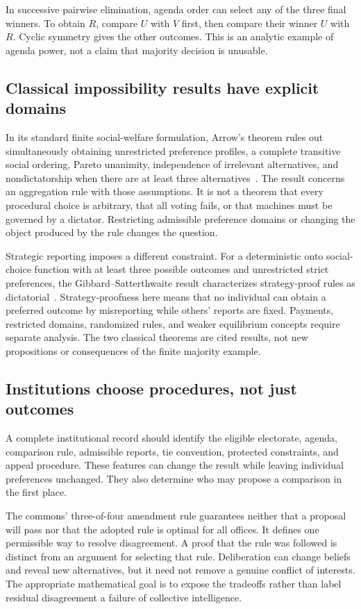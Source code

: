 \documentclass[11pt,letterpaper]{article}
\theoremstyle{plain}
\theoremstyle{definition}
\theoremstyle{remark}
\begin{document}
In successive pairwise elimination, agenda order can select any of the three final winners. To obtain $R$, compare $U$ with $V$ first, then compare their winner $U$ with $R$. Cyclic symmetry gives the other outcomes. This is an analytic example of agenda power, not a claim that majority decision is unusable.

\subsection{Classical impossibility results have explicit domains}
In its standard finite social-welfare formulation, Arrow's theorem rules out simultaneously obtaining unrestricted preference profiles, a complete transitive social ordering, Pareto unanimity, independence of irrelevant alternatives, and nondictatorship when there are at least three alternatives~\cite{arrow}. The result concerns an aggregation rule with those assumptions. It is not a theorem that every procedural choice is arbitrary, that all voting fails, or that machines must be governed by a dictator. Restricting admissible preference domains or changing the object produced by the rule changes the question.

Strategic reporting imposes a different constraint. For a deterministic onto social-choice function with at least three possible outcomes and unrestricted strict preferences, the Gibbard--Satterthwaite result characterizes strategy-proof rules as dictatorial~\cite{gibbard,satterthwaite}. Strategy-proofness here means that no individual can obtain a preferred outcome by misreporting while others' reports are fixed. Payments, restricted domains, randomized rules, and weaker equilibrium concepts require separate analysis. The two classical theorems are cited results, not new propositions or consequences of the finite majority example.

\subsection{Institutions choose procedures, not just outcomes}
A complete institutional record should identify the eligible electorate, agenda, comparison rule, admissible reports, tie convention, protected constraints, and appeal procedure. These features can change the result while leaving individual preferences unchanged. They also determine who may propose a comparison in the first place.

The commons' three-of-four amendment rule guarantees neither that a proposal will pass nor that the adopted rule is optimal for all offices. It defines one permissible way to resolve disagreement. A proof that the rule was followed is distinct from an argument for selecting that rule. Deliberation can change beliefs and reveal new alternatives, but it need not remove a genuine conflict of interests. The appropriate mathematical goal is to expose the tradeoffs rather than label residual disagreement a failure of collective intelligence.
\end{document}
